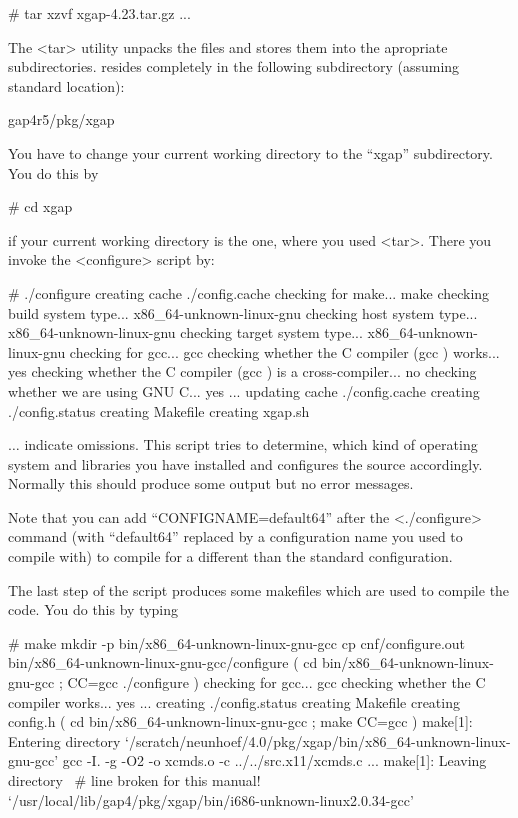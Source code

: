 \begintt
# tar xzvf xgap-4.23.tar.gz
...
\endtt

The <tar> utility unpacks the files and stores them into the apropriate
subdirectories. {\XGAP} resides completely in the following subdirectory
(assuming standard location):

\begintt
gap4r5/pkg/xgap
\endtt


You have to change your current working directory to the ``xgap''
subdirectory. You do this by

\begintt
# cd xgap
\endtt

if your current working directory is the one, where you used
<tar>. There you invoke the <configure> script by:

\begintt
# ./configure
creating cache ./config.cache
checking for make... make
checking build system type... x86_64-unknown-linux-gnu
checking host system type... x86_64-unknown-linux-gnu
checking target system type... x86_64-unknown-linux-gnu
checking for gcc... gcc
checking whether the C compiler (gcc  ) works... yes
checking whether the C compiler (gcc  ) is a cross-compiler... no
checking whether we are using GNU C... yes
...
updating cache ./config.cache
creating ./config.status
creating Makefile
creating xgap.sh
\endtt

$\ldots$ indicate omissions. 
This script tries to determine, which kind of operating system and
libraries you have installed and configures the source
accordingly. Normally this should produce some output but no error
messages. 

Note that you can add ``CONFIGNAME=default64'' after the <./configure>
command (with ``default64'' replaced by a configuration name you used
to compile {\GAP} with) to compile for a different than the standard
configuration.

The last step of the script produces some makefiles which are
used to compile the code. You do this by typing

\begintt
# make
mkdir -p bin/x86_64-unknown-linux-gnu-gcc
cp cnf/configure.out bin/x86_64-unknown-linux-gnu-gcc/configure
( cd bin/x86_64-unknown-linux-gnu-gcc ; CC=gcc ./configure  )
checking for gcc... gcc
checking whether the C compiler works... yes
...
creating ./config.status
creating Makefile
creating config.h
( cd bin/x86_64-unknown-linux-gnu-gcc ; make CC=gcc )
make[1]: Entering directory 
`/scratch/neunhoef/4.0/pkg/xgap/bin/x86_64-unknown-linux-gnu-gcc'
gcc -I. -g -O2   -o xcmds.o -c ../../src.x11/xcmds.c
...
make[1]: Leaving directory \                    # line broken for this manual!
     `/usr/local/lib/gap4/pkg/xgap/bin/i686-unknown-linux2.0.34-gcc'
\endtt

